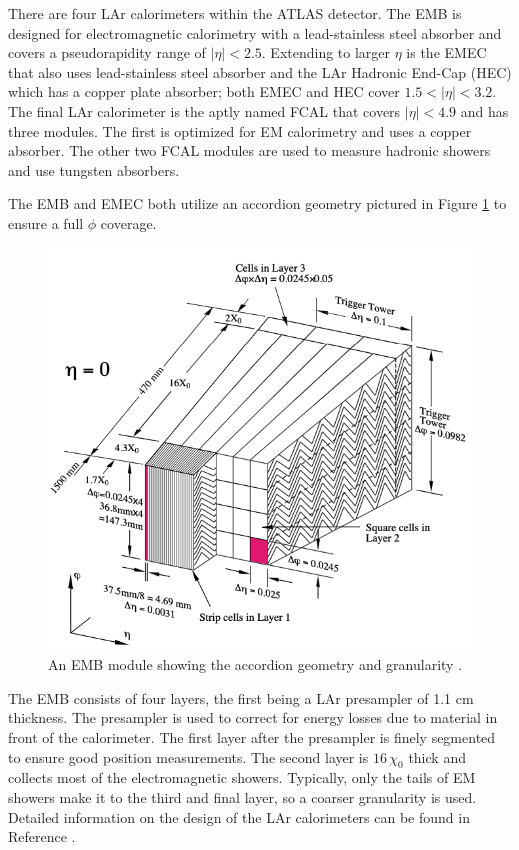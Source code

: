 			There are four \gls{LAr} calorimeters within the \gls{ATLAS} detector. The \gls{EMB} is designed for electromagnetic calorimetry with a lead-stainless steel absorber and covers a pseudorapidity range of $|\eta|<2.5$. Extending to larger $\eta$ is the \gls{EMEC} that also uses lead-stainless steel absorber and the \gls{LAr} Hadronic End-Cap (HEC) which has a copper plate absorber; both \gls{EMEC} and \gls{HEC} cover $1.5 < |\eta| < 3.2$. The final \gls{LAr} calorimeter is the aptly named \gls{FCAL} that covers $|\eta|<4.9$ and has three modules. The first is optimized for \gls{EM} calorimetry and uses a copper absorber. The other two \gls{FCAL} modules are used to measure hadronic showers and use tungsten absorbers.

			The \gls{EMB} and \gls{EMEC} both utilize an accordion geometry pictured in Figure \ref{fig:LAr-accordion} to ensure a full $\phi$ coverage. 
			\begin{figure}[!ht]{}
			\centering
			\includegraphics[width=.75\textwidth,keepaspectratio=true]{chapters/chapter3_experiment/images/LAr_Accordion_Geometry.png}
			\caption{An \gls{EMB} module showing the accordion geometry and granularity \cite{LAr-TDR}.} %
			\label{fig:LAr-accordion}
			\end{figure}
			The \gls{EMB} consists of four layers, the first being a \gls{LAr} presampler of 1.1 cm thickness. The presampler is used to correct for energy losses due to material in front of the calorimeter. The first layer after the presampler is finely segmented to ensure good position measurements. The second layer is $16 \, \chi_0$ thick and collects most of the electromagnetic showers. Typically, only the tails of \gls{EM} showers make it to the third and final layer, so a coarser granularity is used. Detailed information on the design of the \gls{LAr} calorimeters can be found in Reference \cite{LAr-TDR}.

